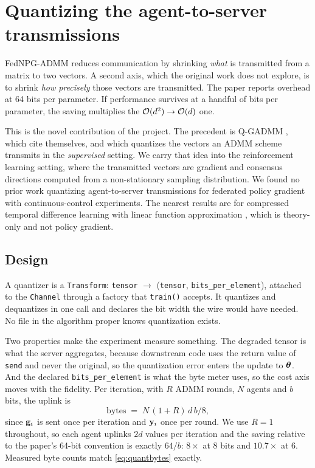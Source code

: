 \section{Quantizing the agent-to-server transmissions}
\label{sec:quantization}

FedNPG-ADMM reduces communication by shrinking \emph{what} is transmitted from
a matrix to two vectors. A second axis, which the original work does not
explore, is to shrink \emph{how precisely} those vectors are transmitted. The
paper reports overhead at 64 bits per parameter. If performance survives at a
handful of bits per parameter, the saving multiplies the $\mathcal{O}(d^2) \to \mathcal{O}(d)$
one.

This is the novel contribution of the project. The precedent is Q-GADMM
\citep{elgabli2021qgadmm}, which \citet{lan2023fednpgadmm} cite themselves, and
which quantizes the vectors an ADMM scheme transmits in the \emph{supervised}
setting. We carry that idea into the reinforcement learning setting, where the
transmitted vectors are gradient and consensus directions computed from a
non-stationary sampling distribution. We found no prior work quantizing
agent-to-server transmissions for federated policy gradient with
continuous-control experiments. The nearest results are for compressed temporal
difference learning with linear function approximation
\citep{mitra2024compressedtd}, which is theory-only and not policy gradient.

\subsection{Design}

A quantizer is a \texttt{Transform}: \texttt{tensor} $\rightarrow$
(\texttt{tensor}, \texttt{bits\_per\_element}), attached to the
\texttt{Channel} through a factory that \texttt{train()} accepts. It quantizes
and dequantizes in one call and declares the bit width the wire would have
needed. No file in the algorithm proper knows quantization exists.

Two properties make the experiment measure something. The degraded tensor is
what the server aggregates, because downstream code uses the return value of
\texttt{send} and never the original, so the quantization error enters the
update to $\boldsymbol{\theta}$. And the declared \texttt{bits\_per\_element} is what the
byte meter uses, so the cost axis moves with the fidelity. Per iteration, with
$R$ ADMM rounds, $N$ agents and $b$ bits, the uplink is
\begin{equation}
  \text{bytes} \;=\; N \,(1 + R)\, d \, b / 8,
  \label{eq:quantbytes}
\end{equation}
since $\mathbf{g}_i$ is sent once per iteration and $\mathbf{y}_i$ once per round. We use
$R = 1$ throughout, so each agent uplinks $2d$ values per iteration and the
saving relative to the paper's 64-bit convention is exactly $64/b$: $8\times$
at 8 bits and $10.7\times$ at 6. Measured byte counts match
\eqref{eq:quantbytes} exactly.

